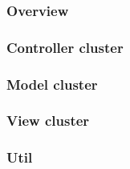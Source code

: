 \subsubsection{Overview}

\subsubsection{Controller cluster}

\subsubsection{Model cluster}

\subsubsection{View cluster}

\subsubsection{Util}

